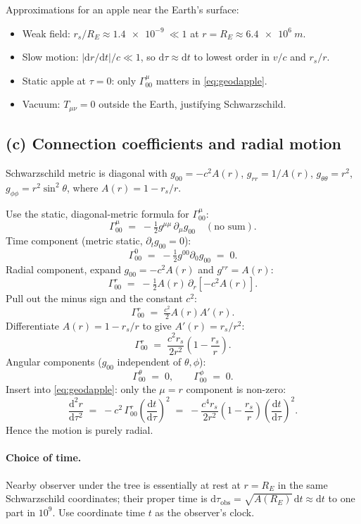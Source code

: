 \documentclass[11pt]{article}
\newcommand{\de}{\mathrm{d}}
\begin{document}
Approximations for an apple near the Earth's surface:
\begin{itemize}\itemsep0pt
\item Weak field: $r_s/R_E \approx \SI{1.4e-9}{} \ll 1$ at $r=R_E\approx \SI{6.4e6}{m}$.
\item Slow motion: $|\de r/\de t|/c \ll 1$, so $\de\tau\approx \de t$ to lowest order in $v/c$ and $r_s/r$.
\item Static apple at $\tau=0$: only $\Gamma^{\mu}_{00}$ matters in \eqref{eq:geodapple}.
\item Vacuum: $T_{\mu\nu}=0$ outside the Earth, justifying Schwarzschild.
\end{itemize}

\subsection*{(c) Connection coefficients and radial motion}

Schwarzschild metric is diagonal with $g_{00}=-c^2 A(r)$, $g_{rr}=1/A(r)$, $g_{\theta\theta}=r^2$, $g_{\phi\phi}=r^2\sin^2\theta$, where $A(r)=1-r_s/r$.

Use the static, diagonal-metric formula for $\Gamma^{\mu}_{00}$:
\[
\Gamma^{\mu}_{00} \;=\; -\tfrac{1}{2}g^{\mu\mu}\,\partial_\mu g_{00}\quad(\text{no sum}).
\]
Time component (metric static, $\partial_t g_{00}=0$):
\[
\Gamma^{0}_{00} \;=\; -\tfrac{1}{2}g^{00}\partial_0 g_{00} \;=\; 0.
\]
Radial component, expand $g_{00}=-c^2 A(r)$ and $g^{rr}=A(r)$:
\[
\Gamma^{r}_{00} \;=\; -\tfrac{1}{2}A(r)\,\partial_r[-c^2 A(r)].
\]
Pull out the minus sign and the constant $c^2$:
\[
\Gamma^{r}_{00} \;=\; \tfrac{c^2}{2}A(r)A'(r).
\]
Differentiate $A(r)=1-r_s/r$ to give $A'(r)=r_s/r^2$:
\[
\Gamma^{r}_{00} \;=\; \frac{c^2 r_s}{2 r^2}\!\left(1-\frac{r_s}{r}\right).
\]
Angular components ($g_{00}$ independent of $\theta,\phi$):
\[
\Gamma^{\theta}_{00} \;=\; 0,\qquad \Gamma^{\phi}_{00} \;=\; 0.
\]
Insert into \eqref{eq:geodapple}: only the $\mu=r$ component is non-zero:
\begin{equation}
\frac{\de^2 r}{\de\tau^2} \;=\; -c^2\,\Gamma^{r}_{00}\!\left(\frac{\de t}{\de\tau}\right)^{2} \;=\; -\frac{c^4 r_s}{2 r^2}\!\left(1-\frac{r_s}{r}\right)\!\left(\frac{\de t}{\de\tau}\right)^{2}.
\label{eq:rgeod}
\end{equation}
Hence the motion is purely radial. \boxed{\;\de^2\theta/\de\tau^2=\de^2\phi/\de\tau^2=0.\;}

\paragraph{Choice of time.}
Nearby observer under the tree is essentially at rest at $r=R_E$ in the same Schwarzschild coordinates; their proper time is $\de\tau_{\text{obs}}=\sqrt{A(R_E)}\,\de t \approx \de t$ to one part in $10^9$. Use coordinate time $t$ as the observer's clock.
\end{document}
